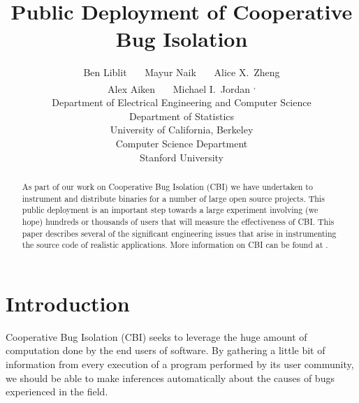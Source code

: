 \documentclass[times,10pt,twocolumn]{article}
\begin{document}
\title{Public Deployment of Cooperative Bug Isolation}

\makeatletter
\newcommand*{\eecsMark}[0]{\@fnsymbol{2}}
\newcommand*{\statMark}[0]{\@fnsymbol{3}}
\newcommand*{\stanMark}[0]{\@fnsymbol{4}}
\makeatother
\newcommand*{\eecs}[0]{\textsuperscript{\eecsMark}}
\newcommand*{\stat}[0]{\textsuperscript{\statMark}}
\newcommand*{\both}[0]{\textsuperscript{\eecsMark, \statMark}}
\newcommand*{\stan}[0]{\textsuperscript{\stanMark}}

\author{
  Ben Liblit \eecs \ \ \ Mayur Naik \stan \ \ \  Alice X.\ Zheng \eecs \\
  Alex Aiken \stan \ \ \ Michael I.\ Jordan \both  \\
 \eecs Department of Electrical Engineering and Computer Science \\ 
  \stat Department of Statistics \\
 University of California, Berkeley \\
 \stan Computer Science Department \\
 Stanford University
}

\maketitle

\begin{abstract}
As part of our work on Cooperative Bug Isolation (CBI) we have undertaken to 
instrument and distribute binaries for a number of large open source projects.
This
public deployment is an important  step towards a large experiment involving (we hope) hundreds or thousands of users that will measure the effectiveness of CBI.
This paper describes several of the significant engineering issues that arise in 
instrumenting the source code of realistic applications.  
More information on CBI can be found at \cite{Liblit:CBIP}.
\end{abstract}

\section{Introduction}

Cooperative Bug Isolation (CBI) seeks to leverage the
huge amount of computation done by the end users of software.  By
gathering a little bit of information from every execution of a
program performed by its user community, we should be able to make
inferences automatically about the causes of bugs experienced in the field.
\end{document}
